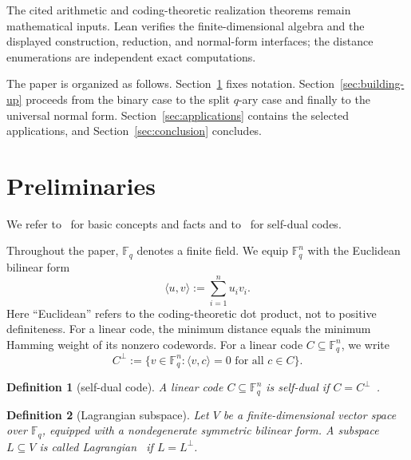 \documentclass[12pt]{article}
\newtheorem{defn}{Definition}[section]
\newcommand{\F}{\mathbb{F}}
\begin{document}
The cited arithmetic and coding-theoretic realization theorems remain
mathematical inputs. Lean verifies the finite-dimensional algebra and the
displayed construction, reduction, and normal-form interfaces; the distance
enumerations are independent exact computations.

The paper is organized as follows. Section~\ref{sec:background} fixes
notation. Section~\ref{sec:building-up} proceeds from the binary case to the
split \(q\)-ary case and finally to the universal normal form.
Section~\ref{sec:applications} contains the selected applications, and
Section~\ref{sec:conclusion} concludes.


\section{Preliminaries}
\label{sec:background}


We refer to~\cite{HuffmanPless} for basic concepts and facts and to~\cite{self-dual} for self-dual codes.

Throughout the paper, \(\F_q\) denotes a finite field. We equip \(\F_q^n\) with the Euclidean bilinear form
\[
\langle u,v\rangle := \sum_{i=1}^n u_i v_i.
\]
Here ``Euclidean'' refers to the coding-theoretic dot product, not to
positive definiteness. For a linear code, the minimum distance equals the
minimum Hamming weight of its nonzero codewords.
For a linear code $C \subseteq \F_q^n$, we write
\[
C^\perp := \{v \in \F_q^n : \langle v,c\rangle = 0 \text{ for all } c \in C\}.
\]

\begin{defn}[self-dual code]\label{def:sd}
{\rm
A linear code $C \subseteq \F_q^n$ is \emph{self-dual} if
$C=C^\perp$~\cite{Pless1965}.
}
\end{defn}

\begin{defn}[Lagrangian subspace]\label{def:lagrangian}
{\rm
Let \(V\) be a finite-dimensional vector space over \(\F_q\), equipped
with a nondegenerate symmetric bilinear form. A subspace \(L\subseteq V\)
is called \emph{Lagrangian}~\cite{Mon,Ser} if \(L=L^\perp\).
}
\end{defn}
\end{document}
